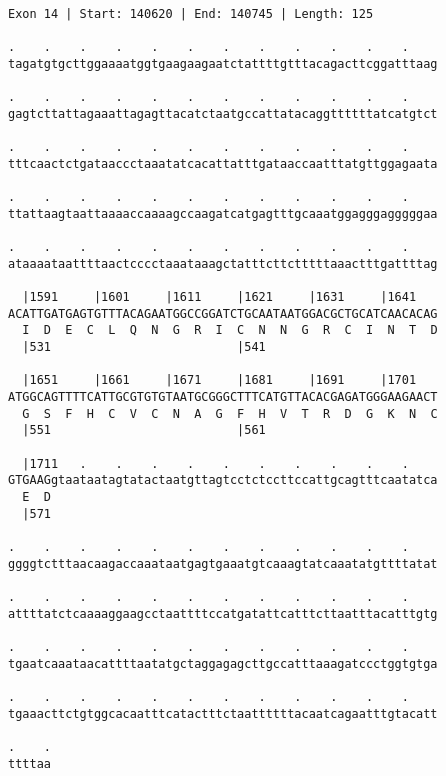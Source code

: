 \documentclass{article}
\begin{document}
\begin{Verbatim}[fontfamily=courier]
Exon 14 | Start: 140620 | End: 140745 | Length: 125

.    .    .    .    .    .    .    .    .    .    .    .    
tagatgtgcttggaaaatggtgaagaagaatctattttgtttacagacttcggatttaag

.    .    .    .    .    .    .    .    .    .    .    .    
gagtcttattagaaattagagttacatctaatgccattatacaggttttttatcatgtct

.    .    .    .    .    .    .    .    .    .    .    .    
tttcaactctgataaccctaaatatcacattatttgataaccaatttatgttggagaata

.    .    .    .    .    .    .    .    .    .    .    .    
ttattaagtaattaaaaccaaaagccaagatcatgagtttgcaaatggagggagggggaa

.    .    .    .    .    .    .    .    .    .    .    .    
ataaaataattttaactcccctaaataaagctatttcttctttttaaactttgattttag

  |1591     |1601     |1611     |1621     |1631     |1641   
ACATTGATGAGTGTTTACAGAATGGCCGGATCTGCAATAATGGACGCTGCATCAACACAG
  I  D  E  C  L  Q  N  G  R  I  C  N  N  G  R  C  I  N  T  D
  |531                          |541                        

  |1651     |1661     |1671     |1681     |1691     |1701   
ATGGCAGTTTTCATTGCGTGTGTAATGCGGGCTTTCATGTTACACGAGATGGGAAGAACT
  G  S  F  H  C  V  C  N  A  G  F  H  V  T  R  D  G  K  N  C
  |551                          |561                        

  |1711   .    .    .    .    .    .    .    .    .    .    
GTGAAGgtaataatagtatactaatgttagtcctctccttccattgcagtttcaatatca
  E  D                                                      
  |571                                                      

.    .    .    .    .    .    .    .    .    .    .    .    
ggggtctttaacaagaccaaataatgagtgaaatgtcaaagtatcaaatatgttttatat

.    .    .    .    .    .    .    .    .    .    .    .    
attttatctcaaaaggaagcctaattttccatgatattcatttcttaatttacatttgtg

.    .    .    .    .    .    .    .    .    .    .    .    
tgaatcaaataacattttaatatgctaggagagcttgccatttaaagatccctggtgtga

.    .    .    .    .    .    .    .    .    .    .    .    
tgaaacttctgtggcacaatttcatactttctaattttttacaatcagaatttgtacatt

.    .
ttttaa
\end{Verbatim}
\newpage
\end{document}
